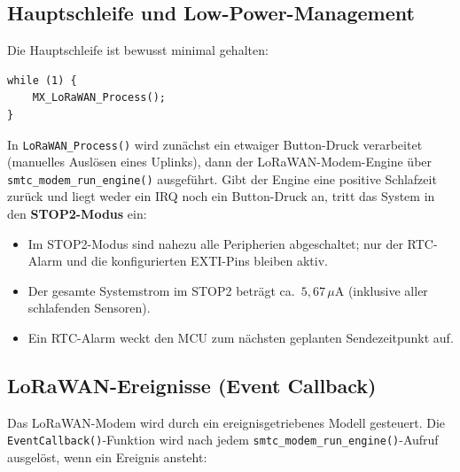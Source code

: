 \newpage
\subsection*{Hauptschleife und Low-Power-Management}

Die Hauptschleife ist bewusst minimal gehalten:

\begin{verbatim}
while (1) {
    MX_LoRaWAN_Process();
}
\end{verbatim}

In \texttt{LoRaWAN\_Process()} wird zunächst ein etwaiger Button-Druck verarbeitet (manuelles Auslösen eines Uplinks), dann der LoRaWAN-Modem-Engine über \texttt{smtc\_modem\_run\_engine()} ausgeführt. Gibt der Engine eine positive Schlafzeit zurück und liegt weder ein IRQ noch ein Button-Druck an, tritt das System in den \textbf{STOP2-Modus} ein:

\begin{itemize}
  \item Im STOP2-Modus sind nahezu alle Peripherien abgeschaltet; nur der RTC-Alarm und die konfigurierten EXTI-Pins bleiben aktiv.
  \item Der gesamte Systemstrom im STOP2 beträgt ca.\ $5{,}67\,\mu\text{A}$ (inklusive aller schlafenden Sensoren).
  \item Ein RTC-Alarm weckt den MCU zum nächsten geplanten Sendezeitpunkt auf.
\end{itemize}

\subsection*{LoRaWAN-Ereignisse (Event Callback)}

Das LoRaWAN-Modem wird durch ein ereignisgetriebenes Modell gesteuert. Die \texttt{EventCallback()}-Funktion wird nach jedem \texttt{smtc\_modem\_run\_engine()}-Aufruf ausgelöst, wenn ein Ereignis ansteht:

